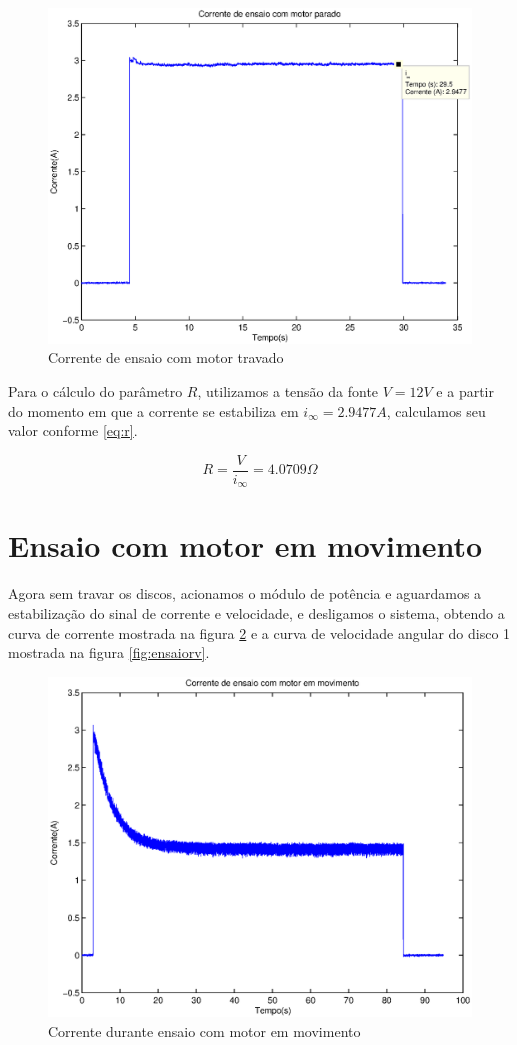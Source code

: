 \documentclass{article}
\begin{document}
\begin{figure}[H]
	\centering
	\includegraphics[width=0.8\linewidth]{../ensaiop}
	\caption{Corrente de ensaio com motor travado}
	\label{fig:ensaiop}
\end{figure}

Para o cálculo do parâmetro $R$, utilizamos a tensão da fonte $V=12 V$ e a partir do momento em que a corrente se estabiliza em $i_\infty=2.9477A$, calculamos seu valor conforme \ref{eq:r}.

\begin{equation}
\label{eq:r}
R = \frac{V}{i_\infty}=4.0709\Omega
\end{equation}

\section{Ensaio com motor em movimento}
Agora sem travar os discos, acionamos o módulo de potência e aguardamos a estabilização do sinal de corrente e velocidade, e desligamos o sistema, obtendo a curva de corrente mostrada na figura \ref{fig:ensaiori} e a curva de velocidade angular do disco 1 mostrada na figura \ref{fig:ensaiorv}.

\begin{figure}[H]
	\centering
	\includegraphics[width=0.8\linewidth]{../ensaiori}
	\caption{Corrente durante ensaio com motor em movimento}
	\label{fig:ensaiori}
\end{figure}
\end{document}
